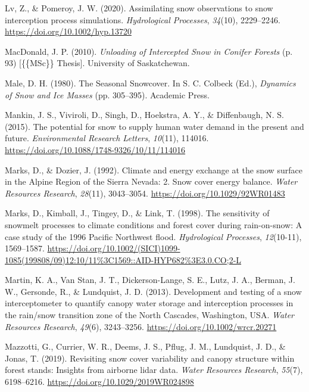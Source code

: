 \documentclass[
  letterpaper,
]{tex/uofsthesis-cs}
\newlength{\cslhangindent}
\newenvironment{CSLReferences}[2] %
 {\begin{list}{}{%
  \setlength{\itemindent}{0pt}
  \setlength{\leftmargin}{0pt}
  \setlength{\parsep}{0pt}
  \ifodd #1
   \setlength{\leftmargin}{\cslhangindent}
   \setlength{\itemindent}{-1\cslhangindent}
  \fi
  \setlength{\itemsep}{#2\baselineskip}}}
 {\end{list}}
\begin{document}
\begin{CSLReferences}{1}{0}
Lv, Z., \& Pomeroy, J. W. (2020). Assimilating snow observations to snow
interception process simulations. \emph{Hydrological Processes},
\emph{34}(10), 2229--2246. \url{https://doi.org/10.1002/hyp.13720}

MacDonald, J. P. (2010). \emph{Unloading of {Intercepted Snow} in
{Conifer Forests}} (p. 93) {[}\{\{MSc\}\} Thesis{]}. University of
Saskatchewan.

Male, D. H. (1980). The {Seasonal Snowcover}. In S. C. Colbeck (Ed.),
\emph{Dynamics of {Snow} and {Ice Masses}} (pp. 305--395). Academic
Press.

Mankin, J. S., Viviroli, D., Singh, D., Hoekstra, A. Y., \& Diffenbaugh,
N. S. (2015). The potential for snow to supply human water demand in the
present and future. \emph{Environmental Research Letters},
\emph{10}(11), 114016.
\url{https://doi.org/10.1088/1748-9326/10/11/114016}

Marks, D., \& Dozier, J. (1992). Climate and energy exchange at the snow
surface in the {Alpine Region} of the {Sierra Nevada}: 2. {Snow} cover
energy balance. \emph{Water Resources Research}, \emph{28}(11),
3043--3054. \url{https://doi.org/10.1029/92WR01483}

Marks, D., Kimball, J., Tingey, D., \& Link, T. (1998). The sensitivity
of snowmelt processes to climate conditions and forest cover during
rain-on-snow: A case study of the 1996 {Pacific Northwest} flood.
\emph{Hydrological Processes}, \emph{12}(10-11), 1569--1587.
\url{https://doi.org/10.1002/(SICI)1099-1085(199808/09)12:10/11\%3C1569::AID-HYP682\%3E3.0.CO;2-L}

Martin, K. A., Van Stan, J. T., Dickerson-Lange, S. E., Lutz, J. A.,
Berman, J. W., Gersonde, R., \& Lundquist, J. D. (2013). Development and
testing of a snow interceptometer to quantify canopy water storage and
interception processes in the rain/snow transition zone of the {North
Cascades}, {Washington}, {USA}. \emph{Water Resources Research},
\emph{49}(6), 3243--3256. \url{https://doi.org/10.1002/wrcr.20271}

Mazzotti, G., Currier, W. R., Deems, J. S., Pflug, J. M., Lundquist, J.
D., \& Jonas, T. (2019). Revisiting snow cover variability and canopy
structure within forest stands: {Insights} from airborne lidar data.
\emph{Water Resources Research}, \emph{55}(7), 6198--6216.
\url{https://doi.org/10.1029/2019WR024898}


\end{CSLReferences}
\end{document}
